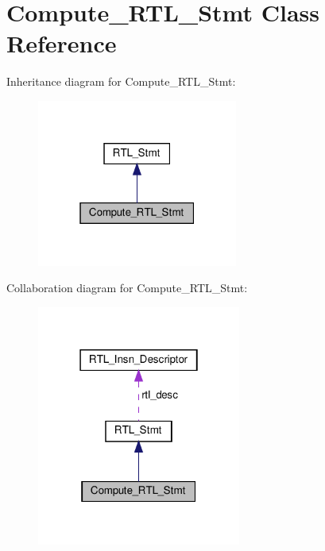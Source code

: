 \hypertarget{classCompute__RTL__Stmt}{}\section{Compute\+\_\+\+R\+T\+L\+\_\+\+Stmt Class Reference}
\label{classCompute__RTL__Stmt}


Inheritance diagram for Compute\+\_\+\+R\+T\+L\+\_\+\+Stmt\+:
\nopagebreak
\begin{figure}[H]
\begin{center}
\leavevmode
\includegraphics[width=187pt]{classCompute__RTL__Stmt__inherit__graph}
\end{center}
\end{figure}


Collaboration diagram for Compute\+\_\+\+R\+T\+L\+\_\+\+Stmt\+:
\nopagebreak
\begin{figure}[H]
\begin{center}
\leavevmode
\includegraphics[width=190pt]{classCompute__RTL__Stmt__coll__graph}
\end{center}
\end{figure}
